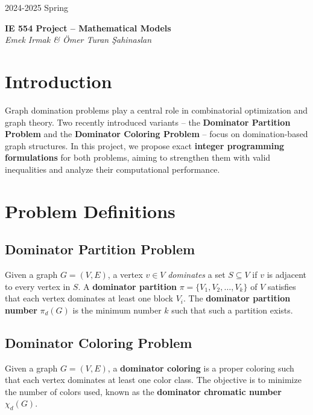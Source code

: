 \documentclass[12pt]{article}
\begin{document}
\begin{tcolorbox}[colback=white, bottomrule=1mm, sharp corners]
    2024-2025 Spring
    \begin{center}
        \Large
        \textbf{IE 554 Project -- Mathematical Models}
        \\[4mm]
        \normalsize
        \hfill \textsl{Emek Irmak \& Ömer Turan Şahinaslan}
    \end{center}
\end{tcolorbox}

\tableofcontents
\clearpage
{}

\section{Introduction}
Graph domination problems play a central role in combinatorial optimization and graph theory. Two recently introduced variants -- the \textbf{Dominator Partition Problem} and the \textbf{Dominator Coloring Problem} -- focus on domination-based graph structures. In this project, we propose exact \textbf{integer programming formulations} for both problems, aiming to strengthen them with valid inequalities and analyze their computational performance.

\section{Problem Definitions}

\subsection{Dominator Partition Problem}
Given a graph $G = (V, E)$, a vertex $v \in V$ \textit{dominates} a set $S \subseteq V$ if $v$ is adjacent to every vertex in $S$. A \textbf{dominator partition} $\pi = \{V_1, V_2, \dots, V_k\}$ of $V$ satisfies that each vertex dominates at least one block $V_i$. The \textbf{dominator partition number} $\pi_d(G)$ is the minimum number $k$ such that such a partition exists.

\subsection{Dominator Coloring Problem}
Given a graph $G = (V, E)$, a \textbf{dominator coloring} is a proper coloring such that each vertex dominates at least one color class. The objective is to minimize the number of colors used, known as the \textbf{dominator chromatic number} $\chi_d(G)$.
\end{document}
